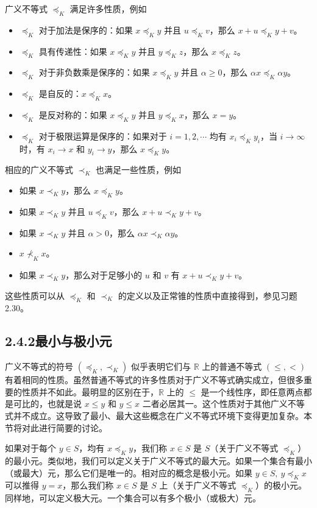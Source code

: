 \documentclass[UTF8,12pt,a4paper,fontset=fandol]{ctexart}
\begin{document}
广义不等式 $\preceq_K$ 满足许多性质，例如
\begin{itemize}
  \item $\preceq_K$ 对于加法是保序的：如果 $x\preceq_K y$ 并且 $u\preceq_K v$，那么 $x+u\preceq_K y+v$。
  \item $\preceq_K$ 具有传递性：如果 $x\preceq_K y$ 并且 $y\preceq_K z$，那么 $x\preceq_K z$。
  \item $\preceq_K$ 对于非负数乘是保序的：如果 $x\preceq_K y$ 并且 $\alpha\ge 0$，那么 $\alpha x\preceq_K\alpha y$。
  \item $\preceq_K$ 是自反的：$x\preceq_K x$。
  \item $\preceq_K$ 是反对称的：如果 $x\preceq_K y$ 并且 $y\preceq_K x$，那么 $x=y$。
  \item $\preceq_K$ 对于极限运算是保序的：如果对于 $i=1,2,\cdots$ 均有 $x_i\preceq_K y_i$，当 $i\to\infty$ 时，有 $x_i\to x$ 和 $y_i\to y$，那么 $x\preceq_K y$。
\end{itemize}
相应的广义不等式 $\prec_K$ 也满足一些性质，例如
\begin{itemize}
  \item 如果 $x\prec_K y$，那么 $x\preceq_K y$。
  \item 如果 $x\prec_K y$ 并且 $u\preceq_K v$，那么 $x+u\prec_K y+v$。
  \item 如果 $x\prec_K y$ 并且 $\alpha>0$，那么 $\alpha x\prec_K\alpha y$。
  \item $x\not\prec_K x$。
  \item 如果 $x\prec_K y$，那么对于足够小的 $u$ 和 $v$ 有 $x+u\prec_K y+v$。
\end{itemize}
这些性质可以从 $\preceq_K$ 和 $\prec_K$ 的定义以及正常锥的性质中直接得到，参见习题 2.30。

\subsection*{2.4.2\quad 最小与极小元}

广义不等式的符号 $(\preceq_K,\prec_K)$ 似乎表明它们与 $\mathbb{R}$ 上的普通不等式 $(\le,<)$ 有着相同的性质。虽然普通不等式的许多性质对于广义不等式确实成立，但很多重要的性质并不如此。最明显的区别在于，$\mathbb{R}$ 上的 $\le$ 是一个线性序，即任意两点都是可比的，也就是说 $x\le y$ 和 $y\le x$ 二者必居其一。这个性质对于其他广义不等式并不成立。这导致了最小、最大这些概念在广义不等式环境下变得更加复杂。本节将对此进行简要的讨论。

如果对于每个 $y\in S$，均有 $x\preceq_K y$，我们称 $x\in S$ 是 $S$（关于广义不等式 $\preceq_K$）的最小元。类似地，我们可以定义关于广义不等式的最大元。如果一个集合有最小（或最大）元，那么它们是唯一的。相对应的概念是极小元。如果 $y\in S,\ y\preceq_K x$ 可以推得 $y=x$，那么我们称 $x\in S$ 是 $S$ 上（关于广义不等式 $\preceq_K$）的极小元。同样地，可以定义极大元。一个集合可以有多个极小（或极大）元。
\end{document}
